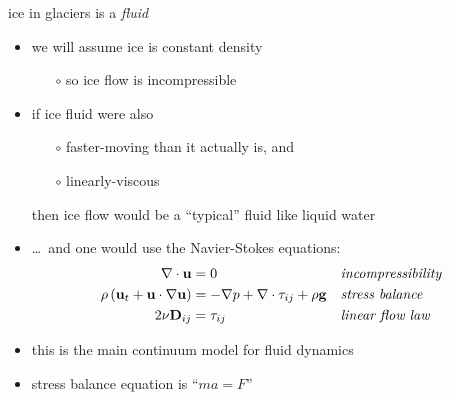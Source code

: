 \begin{frame}{ice in glaciers is a \emph{fluid} }

\begin{itemize}
\item we will assume ice is constant density
  \begin{itemize}
  \item[$\circ$] so ice flow is incompressible
  \end{itemize}

\medskip
\item if ice fluid were also
  \begin{itemize}
  \item[$\circ$] faster-moving than it actually is, and
  \item[$\circ$] linearly-viscous
  \end{itemize}
  then ice flow would be a ``typical'' fluid like liquid water
\item \dots\, and one would use the Navier-Stokes equations:
\begin{align*}
\nabla \cdot \mathbf{u} &= 0 &&\text{\emph{incompressibility}} \\
\rho \left(\mathbf{u}_t + \mathbf{u}\cdot\nabla \mathbf{u}\right) &= -\nabla p + \nabla \cdot \tau_{ij} + \rho \mathbf{g} &&\text{\emph{stress balance}} \\
2 \nu \mathbf{D}_{ij} &= \tau_{ij} &&\text{\emph{linear flow law}}
\end{align*}

\smallskip
\item this is the main continuum model for fluid dynamics
\item stress balance equation is ``$m a = F$''
\end{itemize}
\end{frame}


